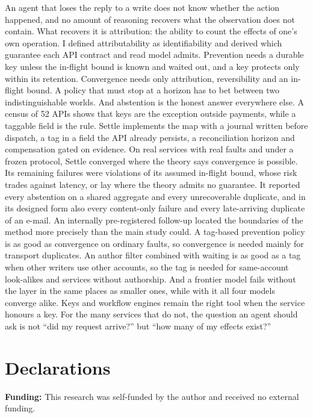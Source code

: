 \documentclass[
  10pt,
]{article}
\begin{document}
An agent that loses the reply to a write does not know whether the
action happened, and no amount of reasoning recovers what the
observation does not contain. What recovers it is attribution: the
ability to count the effects of one's own operation. I defined
attributability as identifiability and derived which guarantee each API
contract and read model admits. Prevention needs a durable key unless
the in-flight bound is known and waited out, and a key protects only
within its retention. Convergence needs only attribution, reversibility
and an in-flight bound. A policy that must stop at a horizon has to bet
between two indistinguishable worlds. And abstention is the honest
answer everywhere else. A census of 52 APIs shows that keys are the
exception outside payments, while a taggable field is the rule. Settle
implements the map with a journal written before dispatch, a tag in a
field the API already persists, a reconciliation horizon and
compensation gated on evidence. On real services with real faults and
under a frozen protocol, Settle converged where the theory says
convergence is possible. Its remaining failures were violations of its
assumed in-flight bound, whose risk trades against latency, or lay where
the theory admits no guarantee. It reported every abstention on a shared
aggregate and every unrecoverable duplicate, and in its designed form
also every content-only failure and every late-arriving duplicate of an
e-mail. An internally pre-registered follow-up located the boundaries of
the method more precisely than the main study could. A tag-based
prevention policy is as good as convergence on ordinary faults, so
convergence is needed mainly for transport duplicates. An author filter
combined with waiting is as good as a tag when other writers use other
accounts, so the tag is needed for same-account look-alikes and services
without authorship. And a frontier model fails without the layer in the
same places as smaller ones, while with it all four models converge
alike. Keys and workflow engines remain the right tool when the service
honours a key. For the many services that do not, the question an agent
should ask is not ``did my request arrive?'' but ``how many of my
effects exist?''

\hypertarget{declarations}{%
\section*{Declarations}\label{declarations}}

\textbf{Funding:} This research was self-funded by the author and
received no external funding.
\end{document}
